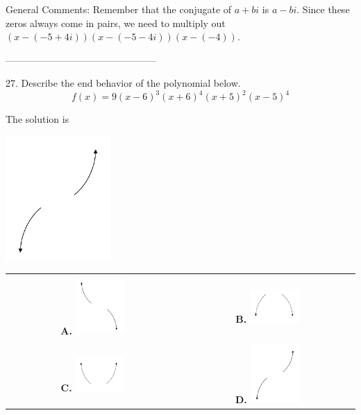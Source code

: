\documentclass{article}[14pt]
\begin{document}
General Comments: Remember that the conjugate of $a+bi$ is $a-bi$. Since these zeros always come in pairs, we need to multiply out $(x-(-5 + 4i))(x-(-5 - 4i))(x-(-4))$.

-----------------------------------------------

27. Describe the end behavior of the polynomial below.
$$ f(x) = 9(x - 6)^{3}(x + 6)^{4}(x + 5)^{2}(x - 5)^{4} $$ 

 
 The solution is  
 \begin{center} \includegraphics[width=0.3\textwidth]{../Figures/endBehaviorPositiveOddA.png} \end{center}\begin{tabular}{|c|c|} 
\hline 
 & \tabularnewline 
 \textbf{A.} \includegraphics[width=0.3\textwidth]{../Figures/endBehaviorNegativeOddA.png} & \textbf{B.} \includegraphics[width=0.3\textwidth]{../Figures/endBehaviorNegativeEvenA.png} \tabularnewline 
\hline 
 & \tabularnewline 
 \textbf{C.} \includegraphics[width=0.3\textwidth]{../Figures/endBehaviorPositiveEvenA.png} & \textbf{D.} \includegraphics[width=0.3\textwidth]{../Figures/endBehaviorPositiveOddA.png} \tabularnewline 

\end{tabular}
\end{document}

